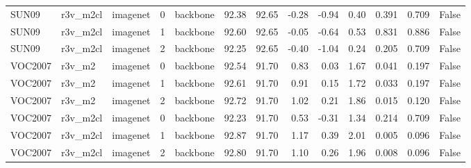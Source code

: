 \begin{table}
\begin{tabular}{lllrlrrrrrllr}
SUN09 & r3v\_m2cl & imagenet & 0 & backbone & 92.38 & 92.65 & -0.28 & -0.94 & 0.40 & 0.391 & 0.709 & False \\
SUN09 & r3v\_m2cl & imagenet & 1 & backbone & 92.60 & 92.65 & -0.05 & -0.64 & 0.53 & 0.831 & 0.886 & False \\
SUN09 & r3v\_m2cl & imagenet & 2 & backbone & 92.25 & 92.65 & -0.40 & -1.04 & 0.24 & 0.205 & 0.709 & False \\
VOC2007 & r3v\_m2 & imagenet & 0 & backbone & 92.54 & 91.70 & 0.83 & 0.03 & 1.67 & 0.041 & 0.197 & False \\
VOC2007 & r3v\_m2 & imagenet & 1 & backbone & 92.61 & 91.70 & 0.91 & 0.15 & 1.72 & 0.033 & 0.197 & False \\
VOC2007 & r3v\_m2 & imagenet & 2 & backbone & 92.72 & 91.70 & 1.02 & 0.21 & 1.86 & 0.015 & 0.120 & False \\
VOC2007 & r3v\_m2cl & imagenet & 0 & backbone & 92.23 & 91.70 & 0.53 & -0.31 & 1.34 & 0.214 & 0.709 & False \\
VOC2007 & r3v\_m2cl & imagenet & 1 & backbone & 92.87 & 91.70 & 1.17 & 0.39 & 2.01 & 0.005 & 0.096 & False \\
VOC2007 & r3v\_m2cl & imagenet & 2 & backbone & 92.80 & 91.70 & 1.10 & 0.26 & 1.96 & 0.008 & 0.096 & False \\
\bottomrule
\end{tabular}
\end{table}
